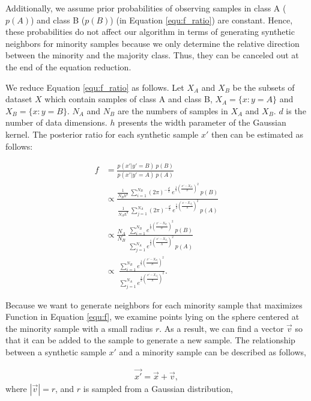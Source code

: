 Additionally, we assume prior probabilities of observing samples in class A ($p(A)$) and class B ($p(B)$) (in Equation \ref{equ:f_ratio}) are constant. Hence, these probabilities do not affect our algorithm in terms of generating synthetic neighbors for minority samples because we only determine the relative direction between the minority and the majority class. Thus, they can be canceled out at the end of the equation reduction. 

We reduce Equation \ref{equ:f_ratio} as follows. Let $X_A$ and $X_B$ be the subsets of dataset $X$ which contain samples of class A and class B, $X_A=\{x: y=A  \}$ and $X_B=\{x: y=B  \}$. $N_A$ and $N_B$ are the numbers of samples in $X_A$ and $X_B$. $d$ is the number of data dimensions. $h$ presents the width parameter of the Gaussian kernel. The posterior ratio for each synthetic sample $x'$ then can be estimated as follows:

\begin{align}
	\label{eq:fracpost_estimation}
	f &= \frac{p(x'|y'=B)  \: p(B)}{p(x'|y'=A) \: p(A)} \\
	&\propto \frac{ \frac{1}{N_B h^d} \: \sum_{i=1}^{N_B}{ (2\pi)^{-\frac{d}{2}} \: e^{\frac{1}{2}{(\frac{x'-X_{B_i}}{h})^2} } } \: p(B) }
	{ \frac{1}{N_A h^d} \:  \sum_{j=1}^{N_A}{ (2\pi)^{-\frac{d}{2}} \: e^{ \frac{1}{2} {(\frac{x-X_{A_j}}{h})^2} } }\: p(A) }\\
	&\propto \frac{N_A}{N_B} \: \frac{ \sum_{i=1}^{N_B}{ e^{\frac{1}{2}{(\frac{x'-X_{B_i}}{h})^2} } } \: p(B)}
	{  \sum_{j=1}^{N_A}{ e^{ \frac{1}{2} {(\frac{x'-X_{A_j}}{h})^2} } } \: p(A)} \label{equ:f_}\\
	&\propto  \: \frac{ \sum_{i=1}^{N_B}{ e^{\frac{1}{2}{(\frac{x'-X_{B_i}}{h})^2} } }}
	{  \sum_{j=1}^{N_A}{ e^{ \frac{1}{2} {(\frac{x'-X_{A_j}}{h})^2} } } } \label{equ:f}.
\end{align} 

Because we want to generate neighbors for each minority sample that maximizes Function  in Equation \ref{equ:f}, we examine points lying on the sphere centered at the minority sample with a small radius $r$. As a result, we can find a vector $\vec{v}$ so that it can be added to the sample to generate a new sample. The relationship between a synthetic sample $x'$ and a minority sample can be described as follows,

\begin{align}
	\label{equ:vecV}
	\vec{x'} =  \vec{x} + \vec{v},
\end{align}
where $|\vec{v}| = r $, and $r$ is sampled from a Gaussian distribution,

